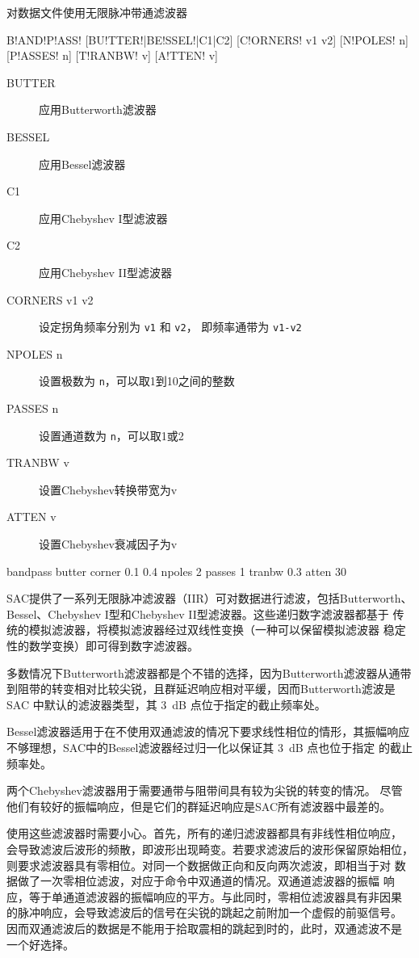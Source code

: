 \label{cmd:bandpass}

对数据文件使用无限脉冲带通滤波器

\begin{SACSTX}
B!AND!P!ASS! [BU!TTER!|BE!SSEL!|C1|C2] [C!ORNERS! v1 v2] [N!POLES! n] [P!ASSES! n]
    [T!RANBW! v] [A!TTEN! v]
\end{SACSTX}

\begin{description}
\item [BUTTER] 应用Butterworth滤波器
\item [BESSEL] 应用Bessel滤波器
\item [C1] 应用Chebyshev I型滤波器
\item [C2] 应用Chebyshev II型滤波器
\item [CORNERS v1 v2] 设定拐角频率分别为 \texttt{v1} 和 \texttt{v2}，
    即频率通带为 \texttt{v1-v2}
\item [NPOLES n] 设置极数为 \texttt{n}，可以取1到10之间的整数
\item [PASSES n] 设置通道数为 \texttt{n}，可以取1或2
\item [TRANBW v] 设置Chebyshev转换带宽为v
\item [ATTEN v] 设置Chebyshev衰减因子为v
\end{description}

\begin{SACDFT}
bandpass butter corner 0.1 0.4 npoles 2 passes 1 tranbw 0.3 atten 30
\end{SACDFT}

SAC提供了一系列无限脉冲滤波器（IIR）可对数据进行滤波，包括Butterworth、
Bessel、Chebyshev I型和Chebyshev II型滤波器。这些递归数字滤波器都基于
传统的模拟滤波器，将模拟滤波器经过双线性变换（一种可以保留模拟滤波器
稳定性的数学变换）即可得到数字滤波器。

多数情况下Butterworth滤波器都是个不错的选择，因为Butterworth滤波器从通带
到阻带的转变相对比较尖锐，且群延迟响应相对平缓，因而Butterworth滤波是SAC
中默认的滤波器类型，其 \SI{3}{dB} 点位于指定的截止频率处。

Bessel滤波器适用于在不使用双通滤波的情况下要求线性相位的情形，其振幅响应
不够理想，SAC中的Bessel滤波器经过归一化以保证其 \SI{3}{\dB} 点也位于指定
的截止频率处。

两个Chebyshev滤波器用于需要通带与阻带间具有较为尖锐的转变的情况。
尽管他们有较好的振幅响应，但是它们的群延迟响应是SAC所有滤波器中最差的。

使用这些滤波器时需要小心。首先，所有的递归滤波器都具有非线性相位响应，
会导致滤波后波形的频散，即波形出现畸变。若要求滤波后的波形保留原始相位，
则要求滤波器具有零相位。对同一个数据做正向和反向两次滤波，即相当于对
数据做了一次零相位滤波，对应于命令中双通道的情况。双通道滤波器的振幅
响应，等于单通道滤波器的振幅响应的平方。与此同时，零相位滤波器具有非因果
的脉冲响应，会导致滤波后的信号在尖锐的跳起之前附加一个虚假的前驱信号。
因而双通滤波后的数据是不能用于拾取震相的跳起到时的，此时，双通滤波不是
一个好选择。

